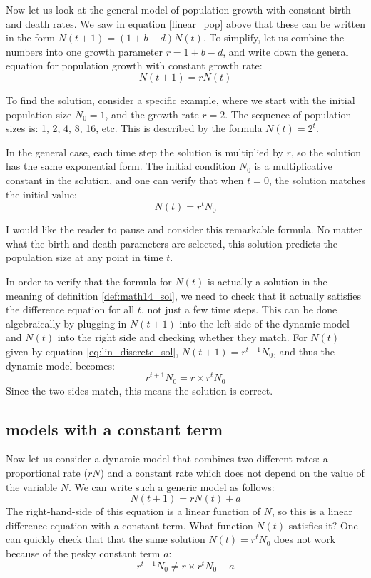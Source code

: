 \documentclass[
]{book}
\theoremstyle{definition}
\theoremstyle{definition}
\theoremstyle{definition}
\theoremstyle{remark}
\begin{document}
Now let us look at the general model of population growth with constant birth and death rates. We saw in equation \ref{linear_pop} above that these can be written in the form \(N(t+1) = (1 + b - d) N(t)\). To simplify, let us combine the numbers into one growth parameter \(r = 1 + b - d\), and write down the general equation for population growth with constant growth rate:
\[N(t+1) =  rN(t)\]

To find the solution, consider a specific example, where we start with the initial population size \(N_0 = 1\), and the growth rate \(r=2\). The sequence of population sizes is: 1, 2, 4, 8, 16, etc. This is described by the formula \(N(t) = 2^t\).

In the general case, each time step the solution is multiplied by \(r\), so the solution has the same exponential form. The initial condition \(N_0\) is a multiplicative constant in the solution, and one can verify that when \(t=0\), the solution matches the initial value:
\begin{equation}
N(t)  = r^t N_0
\label{eq:lin_discrete_sol}
\end{equation}

I would like the reader to pause and consider this remarkable formula. No matter what the birth and death parameters are selected, this solution predicts the population size at any point in time \(t\).

In order to verify that the formula for \(N(t)\) is actually a solution in the meaning of definition \ref{def:math14_sol}, we need to check that it actually satisfies the difference equation for all \(t\), not just a few time steps. This can be done algebraically by plugging in \(N(t+1)\) into the left side of the dynamic model and \(N(t)\) into the right side and checking whether they match. For \(N(t)\) given by equation \ref{eq:lin_discrete_sol}, \(N(t+1) = r^{t+1} N_0\), and thus the dynamic model becomes:
\[r^{t+1} N_0 = r \times r^t N_0\]
Since the two sides match, this means the solution is correct.

\hypertarget{models-with-a-constant-term}{%
\subsection{models with a constant term}\label{models-with-a-constant-term}}

Now let us consider a dynamic model that combines two different rates: a proportional rate (\(rN\)) and a constant rate which does not depend on the value of the variable \(N\). We can write such a generic model as follows:
\[ N(t+1) =  rN(t) + a \]
The right-hand-side of this equation is a linear function of \(N\), so this is a linear difference equation with a constant term. What function \(N(t)\) satisfies it? One can quickly check that that the same solution \(N(t) = r^t N_0\) does not work because of the pesky constant term \(a\):
\[ r^{t+1} N_0 \neq r \times r^t N_0 + a\]
\end{document}
